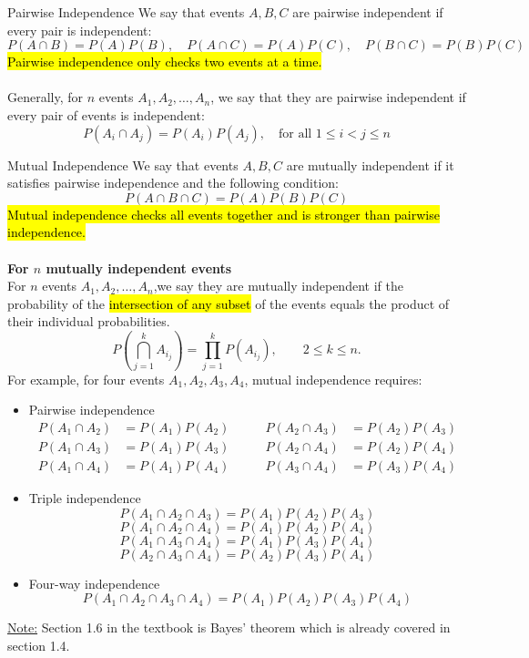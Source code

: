 ﻿\documentclass[12pt]{article}
\begin{document}
\begin{definition}{Pairwise Independence}
    We say that events $A,B,C$ are pairwise independent if every pair is independent:
    \[P(A \cap B) = P(A)P(B), \quad P(A \cap C) = P(A)P(C), \quad P(B \cap C) = P(B)P(C)\]
    \hl{Pairwise independence only checks two events at a time.}\\\\
    Generally, for $n$ events $A_1, A_2, \ldots, A_n$, we say that they are pairwise independent if every pair of events is independent:
    \[P(A_i \cap A_j) = P(A_i)P(A_j), \quad \text{for all } 1 \leq i < j \leq n\]
\end{definition}

\begin{definition}{Mutual Independence}
    We say that events $A,B,C$ are mutually independent if it satisfies pairwise independence and the following condition:
    \[P(A \cap B \cap C) = P(A)P(B)P(C)\]
    \hl{Mutual independence checks all events together and is stronger than pairwise independence.}\\\\
    \textbf{For $n$ mutually independent events}\\
    For $n$ events $A_1, A_2, \ldots, A_n$,we say they are mutually independent if the probability of the \hl{intersection of any subset} of the events equals the product of their individual probabilities.
    \[
P\left(\bigcap_{j=1}^{k} A_{i_j}\right)
=
\prod_{j=1}^{k} P(A_{i_j}),
\qquad 2 \le k \le n.
\]
For example, for four events $A_1,A_2,A_3,A_4$, mutual independence requires:
\begin{itemize}
    \item Pairwise independence
    \[
\begin{aligned}
P(A_1\cap A_2) &= P(A_1)P(A_2)
&\qquad
P(A_2\cap A_3) &= P(A_2)P(A_3) \\[4pt]
P(A_1\cap A_3) &= P(A_1)P(A_3)
&\qquad
P(A_2\cap A_4) &= P(A_2)P(A_4) \\[4pt]
P(A_1\cap A_4) &= P(A_1)P(A_4)
&\qquad
P(A_3\cap A_4) &= P(A_3)P(A_4)
\end{aligned}
\]
    \item Triple independence
    \[
P(A_1\cap A_2\cap A_3)
=
P(A_1)P(A_2)P(A_3)
\]
\[
P(A_1\cap A_2\cap A_4)
=
P(A_1)P(A_2)P(A_4)
\]
\[
P(A_1\cap A_3\cap A_4)
=
P(A_1)P(A_3)P(A_4)
\]
\[
P(A_2\cap A_3\cap A_4)
=
P(A_2)P(A_3)P(A_4)
\]
    \item Four-way independence
\[
P(A_1\cap A_2\cap A_3\cap A_4)
=
P(A_1)P(A_2)P(A_3)P(A_4)
\]
\end{itemize}

\end{definition}
\underline{Note:} Section 1.6 in the textbook is Bayes' theorem which is already covered in section 1.4.
\end{document}
